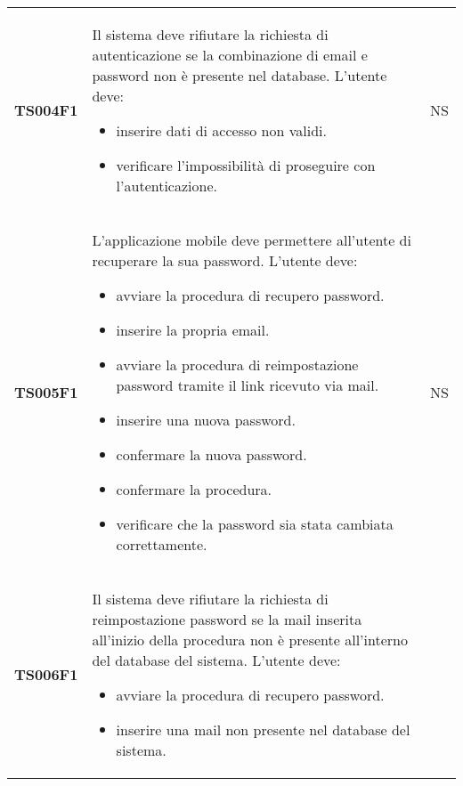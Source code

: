 \documentclass[../piano-di-qualifica.tex]{subfiles}
\begin{document}
\begin{centering}
\begin{longtable}[H]{>{\centering\bfseries}m{3cm} >{}p{10cm} >{\centering\arraybackslash}m{3cm}}
    TS004F1            & Il sistema deve rifiutare la richiesta di autenticazione se la combinazione di email e password non è presente nel database. \newline
    L'utente deve:
    \begin{itemize}
      \item inserire dati di accesso non validi.
      \item verificare l'impossibilità di proseguire con l'autenticazione.
    \end{itemize}
                       & NS                                                                                                                                                                                                                                                               \\
    TS005F1            & L'applicazione mobile deve permettere all'utente di recuperare la sua password. \newline
    L'utente deve:
    \begin{itemize}
      \item avviare la procedura di recupero password.
      \item inserire la propria email.
      \item avviare la procedura di reimpostazione password tramite il link ricevuto via mail.
      \item inserire una nuova password.
      \item confermare la nuova password.
      \item confermare la procedura.
      \item verificare che la password sia stata cambiata correttamente.
    \end{itemize}
                       & NS                                                                                                                                                                                                                                                               \\
    TS006F1            & Il sistema deve rifiutare la richiesta di reimpostazione password se la mail inserita all'inizio della procedura non è presente all'interno del database del sistema. \newline
    L'utente deve:
    \begin{itemize}
      \item avviare la procedura di recupero password.
      \item inserire una mail non presente nel database del sistema.

\end{itemize}
\end{longtable}
\end{centering}
\end{document}
